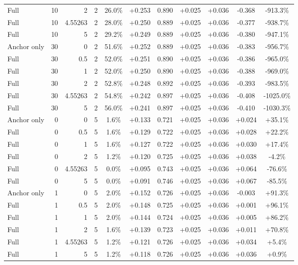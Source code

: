 \begin{table}[htbp]
\begin{tabular}{lrrrccccccc}
Full & 10 & 2 & 2 & 26.0\% & +0.253 & 0.890 & +0.025 & +0.036 & -0.368 & -913.3\% \\
Full & 10 & 4.55263 & 2 & 28.0\% & +0.250 & 0.889 & +0.025 & +0.036 & -0.377 & -938.7\% \\
Full & 10 & 5 & 2 & 29.2\% & +0.249 & 0.889 & +0.025 & +0.036 & -0.380 & -947.1\% \\
Anchor only & 30 & 0 & 2 & 51.6\% & +0.252 & 0.889 & +0.025 & +0.036 & -0.383 & -956.7\% \\
Full & 30 & 0.5 & 2 & 52.0\% & +0.251 & 0.890 & +0.025 & +0.036 & -0.386 & -965.0\% \\
Full & 30 & 1 & 2 & 52.0\% & +0.250 & 0.890 & +0.025 & +0.036 & -0.388 & -969.0\% \\
Full & 30 & 2 & 2 & 52.8\% & +0.248 & 0.892 & +0.025 & +0.036 & -0.393 & -983.5\% \\
Full & 30 & 4.55263 & 2 & 54.8\% & +0.242 & 0.897 & +0.025 & +0.036 & -0.408 & -1025.0\% \\
Full & 30 & 5 & 2 & 56.0\% & +0.241 & 0.897 & +0.025 & +0.036 & -0.410 & -1030.3\% \\
Anchor only & 0 & 0 & 5 & 1.6\% & +0.133 & 0.721 & +0.025 & +0.036 & +0.024 & +35.1\% \\
Full & 0 & 0.5 & 5 & 1.6\% & +0.129 & 0.722 & +0.025 & +0.036 & +0.028 & +22.2\% \\
Full & 0 & 1 & 5 & 1.6\% & +0.127 & 0.722 & +0.025 & +0.036 & +0.030 & +17.4\% \\
Full & 0 & 2 & 5 & 1.2\% & +0.120 & 0.725 & +0.025 & +0.036 & +0.038 & -4.2\% \\
Full & 0 & 4.55263 & 5 & 0.0\% & +0.095 & 0.743 & +0.025 & +0.036 & +0.064 & -76.6\% \\
Full & 0 & 5 & 5 & 0.0\% & +0.091 & 0.746 & +0.025 & +0.036 & +0.067 & -85.5\% \\
Anchor only & 1 & 0 & 5 & 2.0\% & +0.152 & 0.726 & +0.025 & +0.036 & -0.003 & +91.3\% \\
Full & 1 & 0.5 & 5 & 2.0\% & +0.148 & 0.725 & +0.025 & +0.036 & +0.001 & +96.1\% \\
Full & 1 & 1 & 5 & 2.0\% & +0.144 & 0.724 & +0.025 & +0.036 & +0.005 & +86.2\% \\
Full & 1 & 2 & 5 & 1.6\% & +0.139 & 0.723 & +0.025 & +0.036 & +0.011 & +70.8\% \\
Full & 1 & 4.55263 & 5 & 1.2\% & +0.121 & 0.726 & +0.025 & +0.036 & +0.034 & +5.4\% \\
Full & 1 & 5 & 5 & 1.2\% & +0.118 & 0.726 & +0.025 & +0.036 & +0.036 & +0.9\% \\

\end{tabular}
\end{table}
